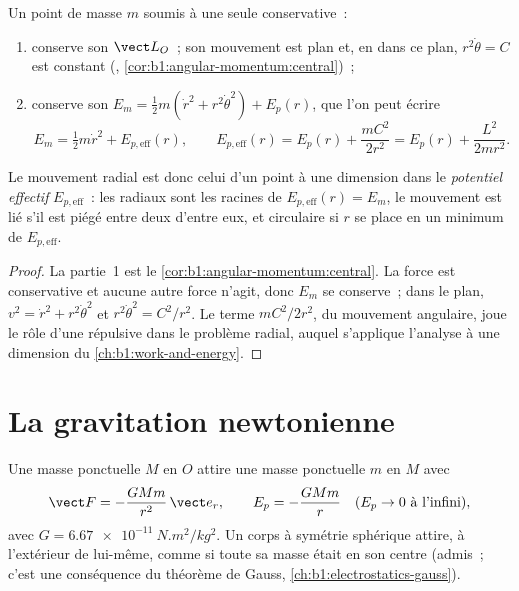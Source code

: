 \begin{theorem}\label{thm:b1:central-forces:reduction}
Un point de masse $m$ soumis à une seule  conservative~:
\begin{enumerate}
  \item conserve son  $\vect L_O$~; son mouvement est
        plan et, en  dans ce plan, $r^2\dot\theta = C$
        est constant (, \cref{cor:b1:angular-momentum:central})~;
  \item conserve son  $E_m = \tfrac12 m(\dot r^2 + r^2\dot\theta^2)
        + E_p(r)$, que l'on peut écrire
        \[
        E_m = \tfrac12 m\dot r^2 + E_{p,\mathrm{eff}}(r), \qquad
        E_{p,\mathrm{eff}}(r) = E_p(r) + \frac{mC^2}{2r^2} = E_p(r) + \frac{L^2}{2mr^2} .
        \]
\end{enumerate}
Le mouvement radial est donc celui d'un point à une dimension dans le
\emph{potentiel effectif} $E_{p,\mathrm{eff}}$~: les  radiaux sont les racines de
$E_{p,\mathrm{eff}}(r) = E_m$, le mouvement est lié s'il est piégé entre
deux d'entre eux, et circulaire si $r$ se place en un minimum de
$E_{p,\mathrm{eff}}$.
\end{theorem}

\begin{proof}
La partie~1 est le \cref{cor:b1:angular-momentum:central}. La force est
conservative et aucune autre force n'agit, donc $E_m$ se conserve~; dans
le plan, $v^2 = \dot r^2 + r^2\dot\theta^2$ et $r^2\dot\theta^2 = C^2/r^2$.
Le terme $mC^2/2r^2$,  du mouvement angulaire, joue le
rôle d'une \emph{} répulsive dans le problème radial,
auquel s'applique l'analyse à une dimension du \cref{ch:b1:work-and-energy}.
\end{proof}

\section{La gravitation newtonienne}

\begin{definition}\label{def:b1:central-forces:gravitation}
Une masse ponctuelle $M$ en $O$ attire une masse ponctuelle $m$ en $M$ avec
\[
\vect F = -\frac{GMm}{r^2}\,\vect e_r, \qquad E_p = -\frac{GMm}{r} \quad (E_p \to 0 \text{ à l'infini}),
\]
avec $G = \qty{6.67e-11}{N.m^2/kg^2}$. Un corps à symétrie sphérique
attire, à l'extérieur de lui-même, comme si toute sa masse était en son
centre (admis~; c'est une conséquence du théorème de Gauss,
\cref{ch:b1:electrostatics-gauss}).
\end{definition}

